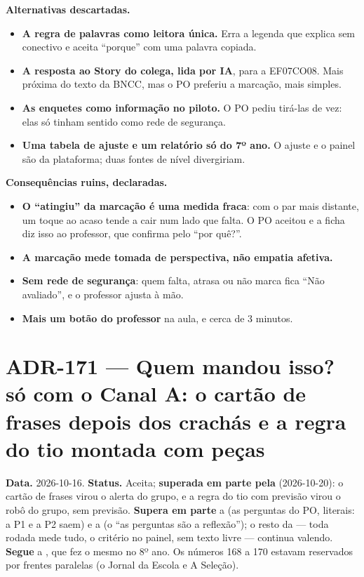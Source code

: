 \textbf{Alternativas descartadas.}

\begin{itemize}
  \item \textbf{A regra de palavras como leitora única.} Erra a legenda que
    explica sem conectivo e aceita \enquote{porque} com uma palavra copiada.
  \item \textbf{A resposta ao Story do colega, lida por IA}, para a EF07CO08.
    Mais próxima do texto da BNCC, mas o PO preferiu a marcação, mais simples.
  \item \textbf{As enquetes como informação no piloto.} O PO pediu tirá-las de
    vez: elas só tinham sentido como rede de segurança.
  \item \textbf{Uma tabela de ajuste e um relatório só do 7º ano.} O ajuste e o
    painel são da plataforma; duas fontes de nível divergiriam.
\end{itemize}

\textbf{Consequências ruins, declaradas.}

\begin{itemize}
  \item \textbf{O \enquote{atingiu} da marcação é uma medida fraca}: com o par mais
    distante, um toque ao acaso tende a cair num lado que falta. O PO aceitou e
    a ficha diz isso ao professor, que confirma pelo \enquote{por quê?}.
  \item \textbf{A marcação mede tomada de perspectiva, não empatia afetiva.}
  \item \textbf{Sem rede de segurança}: quem falta, atrasa ou não marca fica
    \enquote{Não avaliado}, e o professor ajusta à mão.
  \item \textbf{Mais um botão do professor} na aula, e cerca de 3 minutos.
\end{itemize}

\section{ADR-171 --- Quem mandou isso? só com o Canal A: o cartão de frases depois dos crachás e a regra do tio montada com peças}
\label{adr:exp05ef1b-canal-a}

\textbf{Data.} 2026-10-16. \textbf{Status.} Aceita; \textbf{superada em parte
pela } (2026-10-20): o cartão de frases virou o alerta do grupo,
e a regra do tio com previsão virou o robô do grupo, sem previsão.
\textbf{Supera em parte} a
 (as perguntas do PO, literais: a P1 e a P2 saem) e a
 (o \enquote{as perguntas são a reflexão}); o resto da
 --- toda rodada mede tudo, o critério no painel, sem texto livre
--- continua valendo. \textbf{Segue} a , que fez o mesmo no
8º ano. Os números 168 a 170 estavam reservados por frentes paralelas
(o Jornal da Escola e A Seleção).

